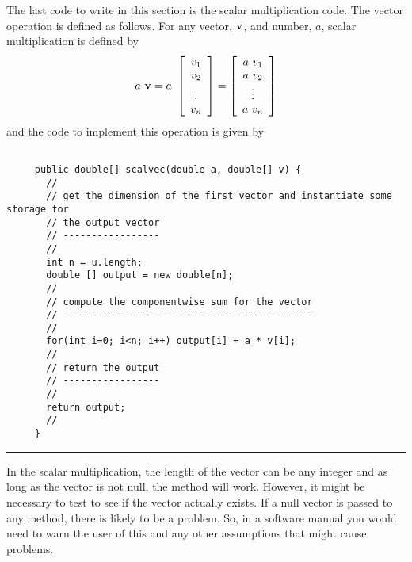 \documentclass[10pt,fleqn]{article}
\begin{document}
The last code to write in this section is the scalar multiplication code. The
vector operation is defined as follows. For any vector, ${\bf v}$, and number,
$a$, scalar multiplication is defined by
$$
  a\ {\bf v} = 
       a\ \left[
            \begin{array}{c}
              v_1 \\
              v_2 \\
              \vdots \\
              v_n
            \end{array}
          \right]
     = \left[
         \begin{array}{c}
           a\ v_1 \\
           a\ v_2 \\
           \vdots \\
           a\ v_n
         \end{array}
       \right]
$$
and the code to implement this operation is given by
\begin{verbatim}

     public double[] scalvec(double a, double[] v) {
       //
       // get the dimension of the first vector and instantiate some storage for
       // the output vector
       // -----------------
       //
       int n = u.length;
       double [] output = new double[n];
       //
       // compute the componentwise sum for the vector
       // --------------------------------------------
       //
       for(int i=0; i<n; i++) output[i] = a * v[i];
       //
       // return the output
       // -----------------
       //
       return output;
       //
     }

\end{verbatim}
\vskip0.1in\hrule\vskip0.1in
In the scalar multiplication, the length of the vector can be any integer and as
long as the vector is not null, the method will work. However, it might be
necessary to test to see if the vector actually exists. If a null vector is
passed to any method, there is likely to be a problem. So, in a software manual
you would need to warn the user of this and any other assumptions that might
cause problems.
\end{document}
